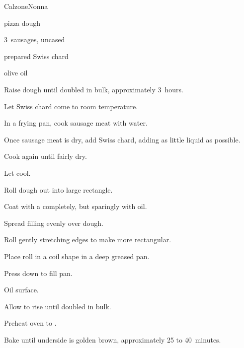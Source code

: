 \begin{recipe}{Calzone}{Nonna}{}

\begin{ingredients}
\item pizza dough
\item 3~sausages, uncased
\item prepared Swiss chard
\item olive oil
\end{ingredients}

\begin{directions}
\item Raise dough until doubled in bulk, approximately 3~hours.
\item Let Swiss chard come to room temperature.
\item In a frying pan, cook sausage meat with \C{\quarter} water.
\item Once sausage meat is dry, add Swiss chard, adding as little liquid as possible.
\item Cook again until fairly dry.
\item Let cool.
\item Roll dough out into large rectangle.
\item Coat with a completely, but sparingly with oil.
\item Spread filling evenly over dough.
\item Roll gently stretching edges to make more rectangular.
\item Place roll in a coil shape in a deep greased pan.
\item Press down to fill pan.
\item Oil surface.
\item Allow to rise until doubled in bulk.
\item Preheat oven to .
\item Bake until underside is golden brown, approximately 25 to 40~minutes.
\end{directions}

\end{recipe}
